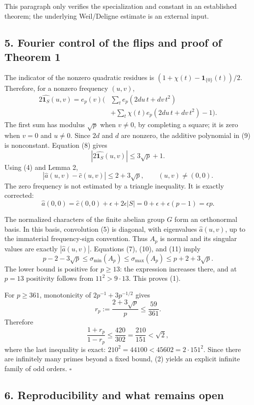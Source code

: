 \documentclass[
  11pt,
]{article}
\begin{document}
This paragraph only verifies the specialization and constant in an
established theorem; the underlying Weil/Deligne estimate is an external
input.

\subsection{5. Fourier control of the flips and proof of Theorem
1}\label{fourier-control-of-the-flips-and-proof-of-theorem-1}

The indicator of the nonzero quadratic residues is
\((1+\chi(t)-\mathbf1_{\{0\}}(t))/2\). Therefore, for a nonzero
frequency \((u,v)\), \[
\begin{aligned}
2\widehat{\mathbf1_S}(u,v)
=e_p(v)\bigg(&\sum_t e_p(2du\,t+dv\,t^2)\\
&+\sum_t\chi(t)e_p(2du\,t+dv\,t^2)-1\bigg).
\end{aligned} \tag{9}
\] The first sum has modulus \(\sqrt p\) when \(v\ne0\), by completing a
square; it is zero when \(v=0\) and \(u\ne0\). Since \(2d\) and \(d\)
are nonzero, the additive polynomial in (9) is nonconstant. Equation (8)
gives \[
\left|2\widehat{\mathbf1_S}(u,v)\right|\leq3\sqrt p+1.
\] Using (4) and Lemma 2, \[
|\widehat a(u,v)-\widehat c(u,v)|\leq2+3\sqrt p,
\qquad (u,v)\ne(0,0). \tag{10}
\] The zero frequency is not estimated by a triangle inequality. It is
exactly corrected: \[
\widehat a(0,0)=\widehat c(0,0)+\epsilon+2\epsilon|S|
=0+\epsilon+\epsilon(p-1)=\epsilon p. \tag{11}
\]

The normalized characters of the finite abelian group \(G\) form an
orthonormal basis. In this basis, convolution (5) is diagonal, with
eigenvalues \(\widehat a(u,v)\), up to the immaterial frequency-sign
convention. Thus \(A_p\) is normal and its singular values are exactly
\(|\widehat a(u,v)|\). Equations (7), (10), and (11) imply \[
p-2-3\sqrt p\leq\sigma_{\min}(A_p)
\leq\sigma_{\max}(A_p)\leq p+2+3\sqrt p.
\] The lower bound is positive for \(p\geq13\): the expression increases
there, and at \(p=13\) positivity follows from \(11^2>9\cdot13\). This
proves (1).

For \(p\geq361\), monotonicity of \(2p^{-1}+3p^{-1/2}\) gives \[
r_p:=\frac{2+3\sqrt p}{p}\leq\frac{59}{361}.
\] Therefore \[
\frac{1+r_p}{1-r_p}\leq\frac{420}{302}
=\frac{210}{151}<\sqrt2,
\] where the last inequality is exact:
\(210^2=44100<45602=2\cdot151^2\). Since there are infinitely many
primes beyond a fixed bound, (2) yields an explicit infinite family of
odd orders. \(\square\)

\subsection{6. Reproducibility and what remains
open}\label{reproducibility-and-what-remains-open}
\end{document}
